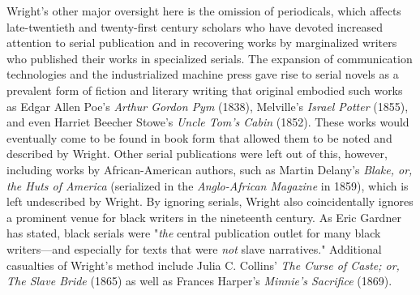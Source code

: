 Wright's other major oversight here is the omission of periodicals, which affects late-twentieth and twenty-first century scholars who have devoted increased attention to serial publication and in recovering works by marginalized writers who published their works in specialized serials. The expansion of communication technologies and the industrialized machine press gave rise to serial novels as a prevalent form of fiction and literary writing that original embodied such works as Edgar Allen Poe's \textit{Arthur Gordon Pym} (1838), Melville's \textit{Israel Potter} (1855), and even Harriet Beecher Stowe's \textit{Uncle Tom's Cabin} (1852). These works would eventually come to be found in book form that allowed them to be noted and described by Wright. Other serial publications were left out of this, however, including works by African-American authors, such as Martin Delany's \textit{Blake, or, the Huts of America} (serialized in the \textit{Anglo-African Magazine} in 1859), which is left undescribed by Wright. By ignoring serials, Wright also coincidentally ignores a prominent venue for black writers in the nineteenth century. As Eric Gardner has stated, black serials were "\textit{the} central publication outlet for many black writers---and especially for texts that were \textit{not} slave narratives."\autocite[10][emphasis Gardner's]{gardner_unexpected_2009} Additional casualties of Wright's method include Julia C. Collins' \textit{The Curse of Caste; or, The Slave Bride} (1865) as well as Frances Harper's \textit{Minnie's Sacrifice} (1869). 

